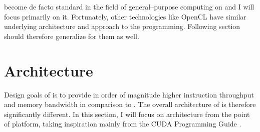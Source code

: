 \cuda become de facto standard in the field of general--purpose computing on \gpu and I will focus primarily on it. Fortunately, other technologies like OpenCL have similar underlying architecture and approach to the \gpu programming. Following section should therefore generalize for them as well.




\section{Architecture}

Design goals of \gpu is to provide in order of magnitude higher instruction throughput and memory bandwidth in comparison to \cpu. The overall architecture of \gpu is therefore significantly different. In this section, I will focus on \gpu architecture from the point of \cuda platform, taking inspiration mainly from the CUDA Programming Guide \citep{CUDAguide}.

